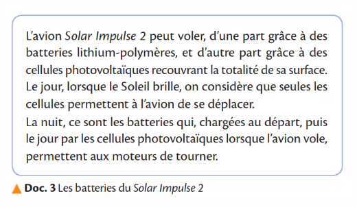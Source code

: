 \documentclass[10pt]{article}
\begin{document}
\begin{minipage}[c]{0.45\textwidth}
	\includegraphics[scale=0.31]{avion_clx/4.png}
\end{minipage}
\end{document}
